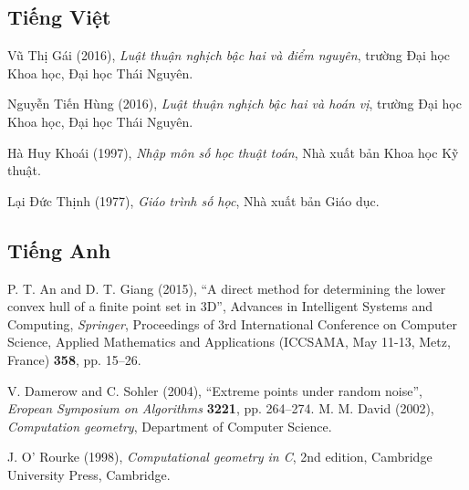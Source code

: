 \documentclass[12pt,a4paper,openany,oneside]{report}
\begin{document}
\begin{thebibliography}{30}
	
\subsection*{Tiếng Việt}

 Vũ Thị Gái (2016), \textit{Luật thuận nghịch bậc hai và điểm nguyên}, trường Đại học Khoa học, Đại học Thái Nguyên.

 Nguyễn Tiến Hùng (2016), \textit{Luật thuận nghịch bậc hai và hoán vị}, trường Đại học Khoa học, Đại học Thái Nguyên.


 Hà Huy Khoái (1997), \textit{Nhập môn số học thuật toán}, Nhà xuất bản Khoa học Kỹ thuật.

 Lại Đức Thịnh (1977), {\it Giáo trình số học}, Nhà xuất bản Giáo dục.
	
\subsection*{Tiếng Anh}
	 P. T. An and D. T. Giang (2015), ``A direct method for determining the lower convex hull of a finite point set in 3D'', Advances in Intelligent Systems and Computing, \textit{Springer}, Proceedings of 3rd International Conference on Computer Science, Applied Mathematics and Applications (ICCSAMA, May 11-13, Metz, France) \textbf{358},  pp. 15--26.


 V. Damerow and C. Sohler (2004), ``Extreme points under random noise'', \textit{Eropean Symposium on Algorithms} {\bf 3221}, pp. 264--274.
  M. M. David (2002), \textit{Computation geometry}, Department of Computer Science.

 J. O' Rourke (1998), \textit{Computational geometry in C}, 2nd edition, Cambridge University Press, Cambridge. 
	
\end{thebibliography} 
\end{document}
